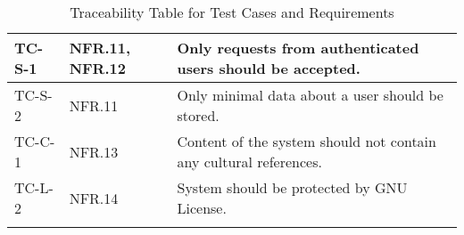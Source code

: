\documentclass[12pt, titlepage]{article}
\begin{document}
\begin{longtable}{| p{2.5cm} | p{3cm} | p{8cm}| }
     \hline
    TC-S-1 & NFR.11, NFR.12 & Only requests from authenticated users should be accepted. \\
     \hline
    TC-S-2 & NFR.11 & Only minimal data about a user should be stored.\\
     \hline
    TC-C-1 & NFR.13 & Content of the system should not contain any cultural references.\\
     \hline
    TC-L-2 & NFR.14 & System should be protected by GNU License.\\
     \hline
    \caption{Traceability Table for Test Cases and Requirements}
    \label{tab:trace}
\end{longtable}








\end{document}
